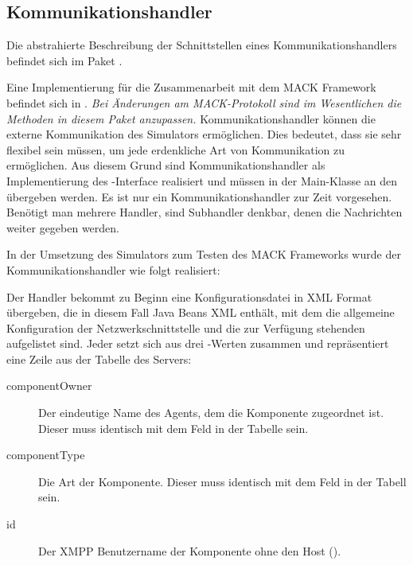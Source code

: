 \subsection{Kommunikationshandler}\label{subsec:real_communication}
Die abstrahierte Beschreibung der Schnittstellen eines Kommunikationshandlers befindet sich im Paket . 

Eine Implementierung für die Zusammenarbeit mit dem MACK Framework befindet sich in . \emph{Bei Änderungen am MACK-Protokoll sind im Wesentlichen die Methoden in diesem Paket anzupassen.}
Kommunikationshandler können die externe Kommunikation des Simulators ermöglichen. Dies bedeutet, dass sie sehr flexibel sein müssen, um jede erdenkliche Art von Kommunikation zu ermöglichen. Aus diesem Grund sind Kommunikationshandler als Implementierung des -Interface realisiert und müssen in der Main-Klasse  an den  übergeben werden. Es ist nur ein Kommunikationshandler zur Zeit vorgesehen. Benötigt man mehrere Handler, sind Subhandler denkbar, denen die Nachrichten weiter gegeben werden.

In der Umsetzung des Simulators zum Testen des MACK Frameworks wurde der Kommunikationshandler  wie folgt realisiert:

Der Handler bekommt zu Beginn eine Konfigurationsdatei in XML Format übergeben, die in diesem Fall Java Beans XML enthält, mit dem die allgemeine Konfiguration der Netzwerkschnittstelle und die zur Verfügung stehenden  aufgelistet sind. Jeder  setzt sich aus drei -Werten zusammen und repräsentiert eine Zeile aus der Tabelle  des Servers:\begin{description}
	\item[componentOwner] Der eindeutige Name des Agents, dem die Komponente zugeordnet ist. Dieser  muss identisch mit dem Feld  in der Tabelle  sein.
	\item[componentType] Die Art der Komponente. Dieser  muss identisch mit dem Feld  in der Tabell sein.
	\item[id] Der XMPP Benutzername der Komponente ohne den Host ().
\end{description}

